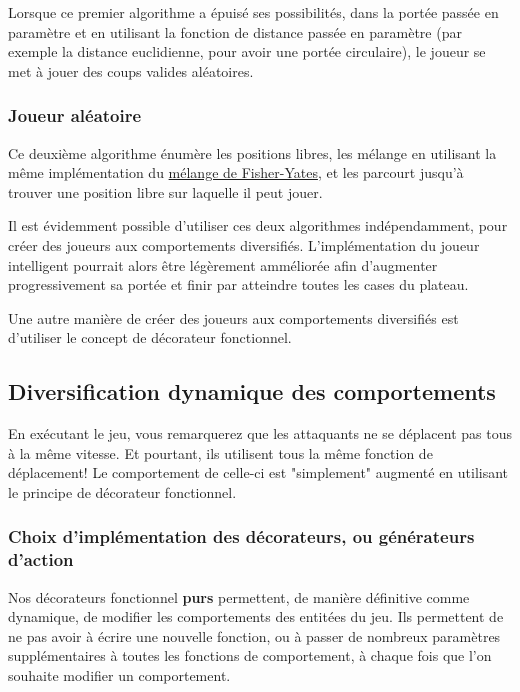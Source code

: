 \documentclass{article}
\begin{document}
Lorsque ce premier algorithme a épuisé ses possibilités, dans la portée passée en paramètre et en utilisant la fonction de distance passée en paramètre (par exemple la distance euclidienne, pour avoir une portée circulaire), le joueur se met à jouer des coups valides aléatoires.

\subsubsection{Joueur aléatoire}

Ce deuxième algorithme énumère les positions libres, les mélange en utilisant la même implémentation du \hyperlink{https://fr.wikipedia.org/wiki/Mélange_de_Fisher-Yates}{mélange de Fisher-Yates}, et les parcourt jusqu'à trouver une position libre sur laquelle il peut jouer.

Il est évidemment possible d'utiliser ces deux algorithmes indépendamment, pour créer des joueurs aux comportements diversifiés. L'implémentation du joueur intelligent pourrait alors être légèrement amméliorée afin d'augmenter progressivement sa portée et finir par atteindre toutes les cases du plateau.

Une autre manière de créer des joueurs aux comportements diversifiés est d'utiliser le concept de décorateur fonctionnel.


\subsection{Diversification dynamique des comportements}

En exécutant le jeu, vous remarquerez que les attaquants ne se déplacent pas tous à la même vitesse. Et pourtant, ils utilisent tous la même fonction de déplacement! Le comportement de celle-ci est "simplement" augmenté en utilisant le principe de décorateur fonctionnel.  

\subsubsection{Choix d'implémentation des décorateurs, ou générateurs d'action}

Nos décorateurs fonctionnel \textbf{purs} permettent, de manière définitive comme dynamique, de modifier les comportements des entitées du jeu.
Ils permettent de ne pas avoir à écrire une nouvelle fonction, ou à passer de nombreux paramètres supplémentaires à toutes les fonctions de comportement, à chaque fois que l'on souhaite modifier un comportement.
\end{document}

